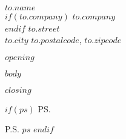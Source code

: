 \documentclass[$if(fontsize)$$fontsize$$else$11pt$endif$]{letter}
\begin{document}
\begin{letter}{$to.name$ \\ $if(to.company)$ $to.company$ \\ $endif$ $to.street$
\\ $to.city$ $to.postalcode$, $to.zipcode$}




\opening{$opening$}

$body$

\closing{$closing$}

$if(ps)$
\ps

P.S. $ps$
$endif$

\end{letter}
\end{document}
